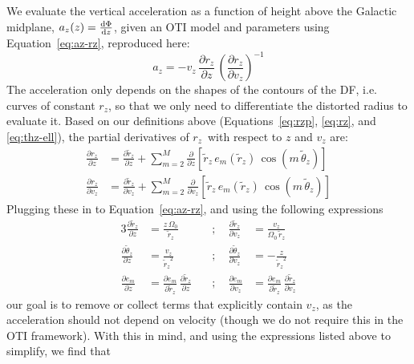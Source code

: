 \documentclass[modern]{aastex631}
\newcommand{\freqzero}{\ensuremath{\Omega_0}}
\newcommand{\mmax}{\ensuremath{M}}
\newcommand{\rz}{\ensuremath{r_z}}
\newcommand{\rzp}{\ensuremath{\tilde{r}_z}}
\newcommand{\thzp}{\ensuremath{\tilde{\theta}_z}}
\begin{document}
We evaluate the vertical acceleration as a function of height above the Galactic
midplane, $a_z(z) = \frac{\mathrm{d}{\Phi}}{\mathrm{d}{z}}$, given an OTI model and parameters using
Equation~\ref{eq:az-rz}, reproduced here:
\begin{equation}
    a_z = - v_z \, \frac{\partial \rz}{\partial z} \,
        \left( \frac{\partial \rz}{\partial v_z} \right)^{-1}
\end{equation}
The acceleration only depends on the shapes of the contours of the DF, i.e. curves of
constant \rz, so that we only need to differentiate the distorted radius to evaluate it.
Based on our definitions above (Equations~\ref{eq:rzp}, \ref{eq:rz}, and
\ref{eq:thz-ell}), the partial derivatives of \rz\ with respect to $z$ and $v_z$ are:
\begin{align}
    \frac{\partial \rz}{\partial z} &=
        \frac{\partial \rzp}{\partial z} +
        \sum_{m=2}^{\mmax} \frac{\partial}{\partial z} \left[\rzp \, e_m(\rzp) \, \cos\left(m \, \thzp\right)\right]\\
    \frac{\partial \rz}{\partial v_z} &=
        \frac{\partial \rzp}{\partial v_z} +
        \sum_{m=2}^{\mmax} \frac{\partial}{\partial v_z} \left[\rzp \, e_m(\rzp) \, \cos\left(m \, \thzp\right)\right]
\end{align}
Plugging these in to Equation~\ref{eq:az-rz}, and using the following expressions
\begin{alignat}{3}
    \frac{\partial \rzp}{\partial z} &= \frac{z\,\freqzero}{\rzp} \quad &; \quad
        \frac{\partial \rzp}{\partial v_z} &= \frac{v_z}{\freqzero \, \rzp} \\
    \frac{\partial \thzp}{\partial z} &= \frac{v_z}{\rzp^2} \quad &; \quad
        \frac{\partial \thzp}{\partial v_z} &= -\frac{z}{\rzp^2} \\
    \frac{\partial e_m}{\partial z} &=
        \frac{\partial e_m}{\partial \rzp} \, \frac{\partial \rzp}{\partial z}
        \quad &; \quad
        \frac{\partial e_m}{\partial v_z} &=
        \frac{\partial e_m}{\partial \rzp} \, \frac{\partial \rzp}{\partial v_z}
\end{alignat}
our goal is to remove or collect terms that explicitly contain $v_z$, as the
acceleration should not depend on velocity (though we do not require this in the OTI
framework).
With this in mind, and using the expressions listed above to simplify, we find that
\end{document}
